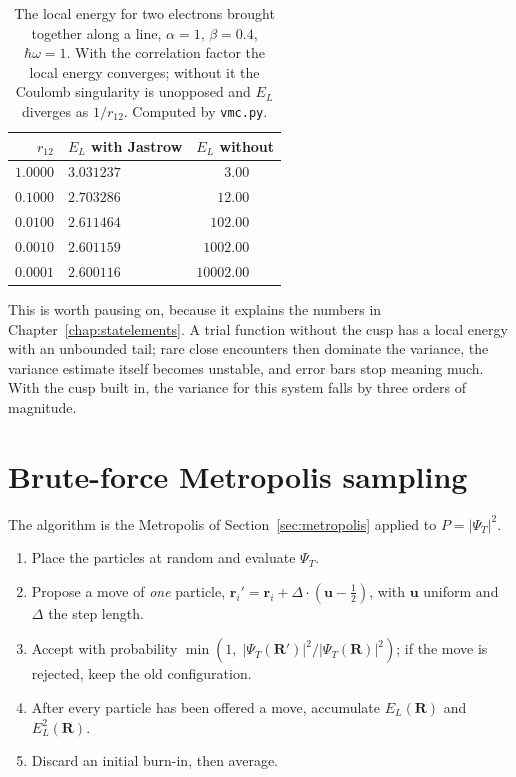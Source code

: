 \begin{table}[h]
\centering
\renewcommand{\arraystretch}{1.25}
\setlength{\tabcolsep}{16pt}
\begin{tabular}{rll}
\toprule
$r_{12}$ & $E_L$ with Jastrow & $E_L$ without\\
\midrule
$1.0000$ & $3.031237$ & $\phantom{0000}3.00$\\
$0.1000$ & $2.703286$ & $\phantom{000}12.00$\\
$0.0100$ & $2.611464$ & $\phantom{00}102.00$\\
$0.0010$ & $2.601159$ & $\phantom{0}1002.00$\\
$0.0001$ & $2.600116$ & $10002.00$\\
\bottomrule
\end{tabular}
\caption{The local energy for two electrons brought together along a line,
$\alpha=1$, $\beta=0.4$, $\hbar\omega=1$.  With the correlation factor the
local energy converges; without it the Coulomb singularity is unopposed and
$E_L$ diverges as $1/r_{12}$.  Computed by \texttt{vmc.py}.}
\label{tab:13-cusp}
\end{table}

This is worth pausing on, because it explains the numbers in
Chapter~\ref{chap:statelements}.  A trial function without the cusp has a
local energy with an unbounded tail; rare close encounters then dominate the
variance, the variance estimate itself becomes unstable, and error bars stop
meaning much.  With the cusp built in, the variance for this system falls by
three orders of magnitude.

\section{Brute-force Metropolis sampling}
\label{sec:vmcbrute}

The algorithm is the Metropolis of Section~\ref{sec:metropolis} applied to
$P=|\Psi_T|^2$.

\begin{svgraybox}
\begin{enumerate}
\item Place the particles at random and evaluate $\Psi_T$.
\item Propose a move of \emph{one} particle,
  $\bm{r}_i' = \bm{r}_i + \Delta\cdot(\bm{u}-\tfrac12)$, with $\bm{u}$
  uniform and $\Delta$ the step length.
\item Accept with probability
  $\min\left(1,\;|\Psi_T(\bm{R}')|^2/|\Psi_T(\bm{R})|^2\right)$; if the move
  is rejected, keep the old configuration.
\item After every particle has been offered a move, accumulate $E_L(\bm{R})$
  and $E_L^2(\bm{R})$.
\item Discard an initial burn-in, then average.
\end{enumerate}
\end{svgraybox}

